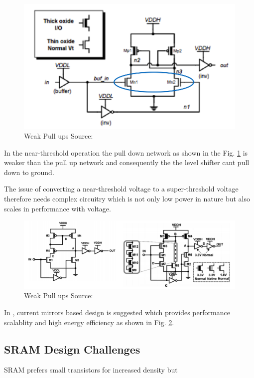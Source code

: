 \documentclass[conference]{IEEEtran}
\begin{document}
\begin{figure}[htbp]
	\includegraphics[width=\linewidth]{img/Pictures/Level_shift_weak.png}
	\centering
	\caption{Weak Pull ups Source: \cite{b3}}
	\label{fig:Weak_Pull_ups}
\end{figure}

In the near-threshold operation the pull down network as shown in the Fig. \ref{fig:Weak_Pull_ups} is weaker than the pull up network and consequently the the level shifter cant pull down to ground.

The issue of converting a near-threshold voltage to a super-threshold voltage
therefore needs complex circuitry which is not only low power in nature but
also scales in performance with voltage. 

\begin{figure}[htbp]
	\includegraphics[width=\linewidth]{img/Pictures/Level_shifter_solution.png}
	\centering
	\caption{Weak Pull ups Source: \cite{b6}}
	\label{fig:Level_shifter_solution}
\end{figure}

In \cite{b4}\cite{b5}\cite{b6}, current mirrors based design is suggested which provides performance scalablity
and high energy efficiency as shown in Fig. \ref{fig:Level_shifter_solution}.

\subsection{SRAM Design Challenges}
SRAM prefers small transistors for increased density but
\end{document}
